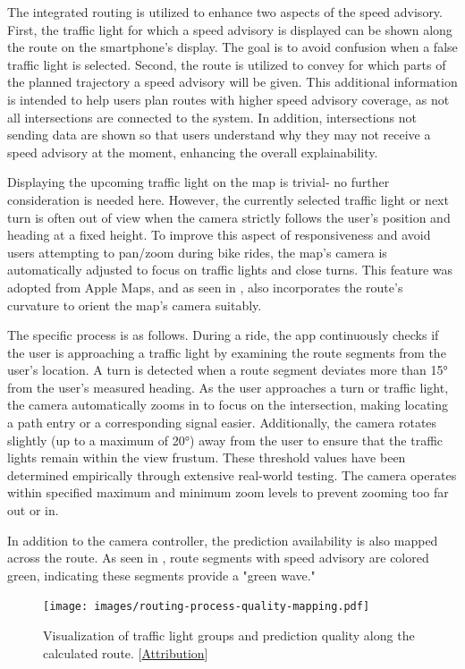 The integrated routing is utilized to enhance two aspects of the speed advisory. First, the traffic light for which a speed advisory is displayed can be shown along the route on the smartphone's display. The goal is to avoid confusion when a false traffic light is selected. Second, the route is utilized to convey for which parts of the planned trajectory a speed advisory will be given. This additional information is intended to help users plan routes with higher speed advisory coverage, as not all intersections are connected to the system. In addition, intersections not sending data are shown so that users understand why they may not receive a speed advisory at the moment, enhancing the overall explainability.

Displaying the upcoming traffic light on the map is trivial- no further consideration is needed here. However, the currently selected traffic light or next turn is often out of view when the camera strictly follows the user's position and heading at a fixed height. To improve this aspect of responsiveness and avoid users attempting to pan/zoom during bike rides, the map's camera is automatically adjusted to focus on traffic lights and close turns. This feature was adopted from Apple Maps, and as seen in , also incorporates the route's curvature to orient the map's camera suitably.

The specific process is as follows. During a ride, the app continuously checks if the user is approaching a traffic light by examining the route segments from the user's location. A turn is detected when a route segment deviates more than 15° from the user's measured heading. As the user approaches a turn or traffic light, the camera automatically zooms in to focus on the intersection, making locating a path entry or a corresponding signal easier. Additionally, the camera rotates slightly (up to a maximum of 20°) away from the user to ensure that the traffic lights remain within the view frustum. These threshold values have been determined empirically through extensive real-world testing. The camera operates within specified maximum and minimum zoom levels to prevent zooming too far out or in.

In addition to the camera controller, the prediction availability is also mapped across the route. As seen in , route segments with speed advisory are colored green, indicating these segments provide a "green wave." 

\begin{figure}[t]
\centering
\texttt{[image: images/routing-process-quality-mapping.pdf]}
\caption{Visualization of traffic light groups and prediction quality along the calculated route. [\hyperref[attribution]{Attribution}]}
\label{fig:routing-process-quality-mapping}
\end{figure}


